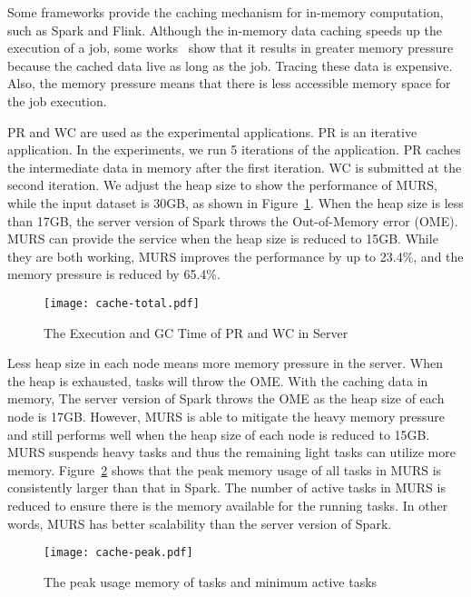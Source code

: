 Some frameworks provide the caching mechanism for in-memory computation, such as Spark and Flink. Although the in-memory data caching speeds up the execution of a job, some works~\cite{bu:bloat, nguyen2015facade} show that it results in greater memory pressure because the cached data live as long as the job. Tracing these data is expensive. Also, the memory pressure means that there is less accessible memory space for the job execution.


PR and WC are used as the experimental applications. PR is an iterative application. In the experiments, we run 5 iterations of the application. PR caches the intermediate data in memory after the first iteration. WC is submitted at the second iteration. We adjust the heap size to show the performance of MURS, while the input dataset is 30GB, as shown in Figure~\ref{fig:cache-total}. When the heap size is less than 17GB, the server version of Spark throws the Out-of-Memory error (OME). MURS can provide the service when the heap size is reduced to 15GB. While they are both working, MURS improves the performance by up to 23.4\%, and the memory pressure is reduced by 65.4\%.

\begin{figure}[!t]
\centering
\texttt{[image: cache-total.pdf]}
\caption{The Execution and GC Time of PR and WC in Server}
\label{fig:cache-total}
\end{figure}

Less heap size in each node means more memory pressure in the server. When the heap is exhausted, tasks will throw the OME. With the caching data in memory, The server version of Spark throws the OME as the heap size of each node is 17GB. However, MURS is able to mitigate the heavy memory pressure and still performs well when the heap size of each node is reduced to 15GB. MURS suspends heavy tasks and  thus the remaining light tasks can utilize more memory. Figure~\ref{fig:cache-peak} shows that the peak memory usage of all tasks in MURS is consistently larger than that in Spark. The number of active tasks in MURS is reduced to ensure there is the memory available for the running tasks. In other words, MURS has better scalability than the server version of Spark.

\begin{figure}[!t]
\centering
\texttt{[image: cache-peak.pdf]}
\caption{The peak usage memory of tasks and minimum active tasks}
\label{fig:cache-peak}
\end{figure}


